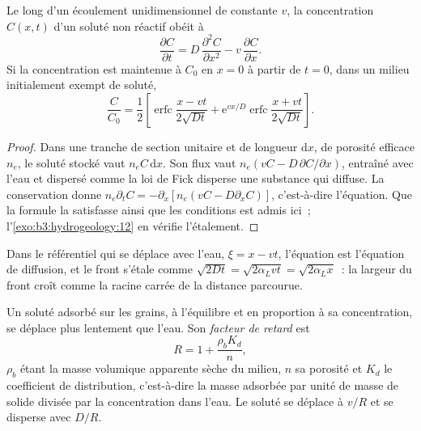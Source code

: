 \begin{theorem}\label{thm:b3:hydrogeology:ade}
Le long d'un écoulement unidimensionnel de  constante $v$, la
concentration $C(x, t)$ d'un soluté non réactif obéit à
\[
\frac{\partial C}{\partial t} = D\,\frac{\partial^2C}{\partial x^2} -
v\,\frac{\partial C}{\partial x} .
\]
Si la concentration est maintenue à $C_0$ en $x = 0$ à partir de $t = 0$, dans un
milieu initialement exempt de soluté,
\[
\frac{C}{C_0} = \frac12\left[\operatorname{erfc}\frac{x - vt}{2\sqrt{Dt}} +
\mathrm e^{vx/D}\operatorname{erfc}\frac{x + vt}{2\sqrt{Dt}}\right] .
\]
\end{theorem}

\begin{proof}
Dans une tranche de section unitaire et de longueur $\mathrm dx$, de porosité
efficace $n_e$, le soluté stocké vaut $n_eC\,\mathrm dx$. Son flux vaut
$n_e(vC - D\,\partial C/\partial x)$, entraîné avec l'eau et dispersé comme la
loi de Fick disperse une substance qui diffuse. La conservation donne
$n_e\partial_tC = -\partial_x[n_e(vC - D\partial_xC)]$, c'est-à-dire l'équation. Que la
formule la satisfasse ainsi que les conditions est admis ici~;
l'\cref{exo:b3:hydrogeology:12} en vérifie l'étalement.
\end{proof}

Dans le référentiel qui se déplace avec l'eau, $\xi = x - vt$, l'équation est
l'équation de diffusion, et le front s'étale comme $\sqrt{2Dt} = \sqrt{2\alpha_L
vt} = \sqrt{2\alpha_Lx}$~: la largeur du front croît comme la racine carrée
de la distance parcourue.

\begin{definition}\label{def:b3:hydrogeology:retardation}
Un soluté adsorbé sur les grains, à l'équilibre et en proportion
à sa concentration, se déplace plus lentement que l'eau. Son
\emph{facteur de retard} est
\[
R = 1 + \frac{\rho_bK_d}{n} ,
\]
$\rho_b$ étant la masse volumique apparente sèche du milieu, $n$ sa porosité et
$K_d$ le coefficient de distribution, c'est-à-dire la masse adsorbée par unité de masse de
solide divisée par la concentration dans l'eau. Le soluté se déplace à $v/R$
et se disperse avec $D/R$.
\end{definition}

